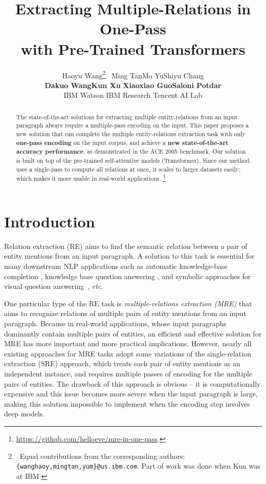 \documentclass[11pt,a4paper]{article}
\title{Extracting Multiple-Relations in One-Pass \\ with Pre-Trained Transformers}
\author{
 Haoyu Wang\thanks{\, Equal contributions from the corresponding authors: \texttt{\{wanghaoy,mingtan,yum\}@us.ibm.com}. Part of work was done when Kun was at IBM.}  \quad \quad \   Ming Tan\quad \quad Mo Yu\quad \quad Shiyu Chang \\ 
 \textbf{Dakuo Wang}\quad \quad \textbf{Kun Xu} \quad \quad \textbf{Xiaoxiao Guo}\quad \quad \textbf{Saloni Potdar}\\
 IBM Watson \quad \quad IBM Research \quad \quad Tencent AI Lab\\
}
\date{}
\begin{document}
\maketitle
\begin{abstract}
The state-of-the-art solutions for extracting multiple entity-relations from an input paragraph always require a multiple-pass encoding on the input.
This paper proposes a new solution that can complete the multiple entity-relations extraction task with only \textbf{one-pass encoding} on the input corpus, and achieve a \textbf{new state-of-the-art accuracy performance}, as demonstrated in the ACE 2005 benchmark. Our solution is built on top of the pre-trained self-attentive models (Transformer). Since our method uses a single-pass to compute all relations at once, it scales to larger datasets easily; which makes it more usable in real-world applications. \footnote{\scriptsize{\url{https://github.com/helloeve/mre-in-one-pass}.}}

\end{abstract}



\section{Introduction}
Relation extraction (RE) aims to find the semantic relation between a pair of entity mentions from an input paragraph. A solution to this task is essential for many downstream NLP applications such as automatic knowledge-base completion \cite{surdeanu2012multi,riedel2013relation,verga2016multilingual},  knowledge base question answering \cite{yih2015semantic,xu2016question,yu2017improved}, and symbolic approaches for visual question answering~\cite{mao2019neuro,hu2019language}, \emph{etc}. 

One particular type of the RE task is \emph{multiple-relations extraction (MRE)} that aims to recognize relations of multiple pairs of entity mentions from an input paragraph. Because in real-world applications, whose input paragraphs dominantly contain multiple pairs of entities, an efficient and effective solution for MRE has more important and more practical implications. However, nearly all existing approaches for MRE tasks \cite{qu2014senti,gormley2015improved,nguyen2015combining} adopt some variations of the single-relation extraction (SRE) approach, which treats each pair of entity mentions as an independent instance, and requires multiple passes of encoding for the multiple pairs of entities.  The drawback of this approach is obvious -- it is computationally expensive and this issue becomes more severe when the input paragraph is large, making this solution impossible to implement when the encoding step involves deep models.
\end{document}
